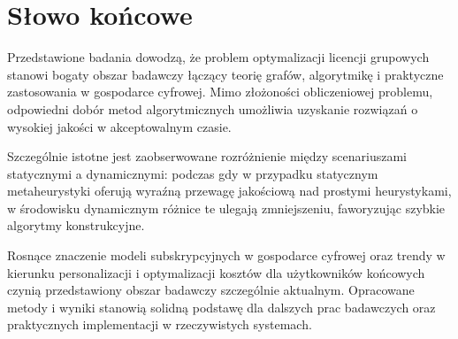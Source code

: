 \section{Słowo końcowe}

Przedstawione badania dowodzą, że problem optymalizacji licencji grupowych stanowi bogaty obszar badawczy łączący teorię grafów, algorytmikę i praktyczne zastosowania w gospodarce cyfrowej. Mimo złożoności obliczeniowej problemu, odpowiedni dobór metod algorytmicznych umożliwia uzyskanie rozwiązań o wysokiej jakości w akceptowalnym czasie.

Szczególnie istotne jest zaobserwowane rozróżnienie między scenariuszami statycznymi a dynamicznymi: podczas gdy w przypadku statycznym metaheurystyki oferują wyraźną przewagę jakościową nad prostymi heurystykami, w środowisku dynamicznym różnice te ulegają zmniejszeniu, faworyzując szybkie algorytmy konstrukcyjne.

Rosnące znaczenie modeli subskrypcyjnych w gospodarce cyfrowej oraz trendy w kierunku personalizacji i optymalizacji kosztów dla użytkowników końcowych czynią przedstawiony obszar badawczy szczególnie aktualnym. Opracowane metody i wyniki stanowią solidną podstawę dla dalszych prac badawczych oraz praktycznych implementacji w rzeczywistych systemach.
